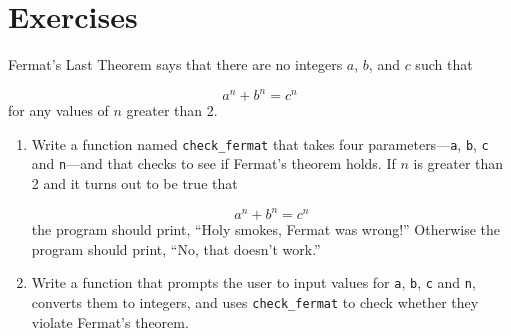 \documentclass[10pt]{book}
\begin{document}
\section{Exercises}

\begin{ex}

Fermat's Last Theorem says that there are no integers
$a$, $b$, and $c$ such that

\[ a^n + b^n = c^n \]
%
for any values of $n$ greater than 2.

\begin{enumerate}

\item Write a function named \verb"check_fermat" that takes four
parameters---{\tt a}, {\tt b}, {\tt c} and {\tt n}---and
that checks to see if Fermat's theorem holds.  If
$n$ is greater than 2 and it turns out to be true that 

\[a^n + b^n = c^n \]
%
the program should print, ``Holy smokes, Fermat was wrong!''
Otherwise the program should print, ``No, that doesn't work.''

\item Write a function that prompts the user to input values
for {\tt a}, {\tt b}, {\tt c} and {\tt n}, converts them to
integers, and uses \verb"check_fermat" to check whether they
violate Fermat's theorem.

\end{enumerate}

\end{ex}
\end{document}
